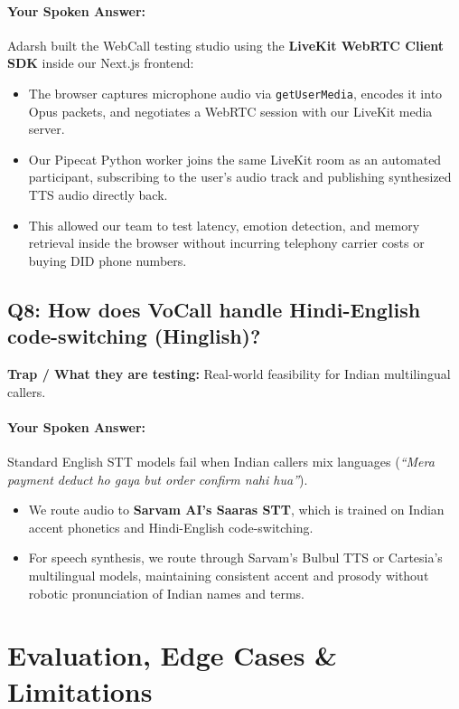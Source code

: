\documentclass[11pt,a4paper]{article}
\begin{document}
\paragraph{Your Spoken Answer:}
Adarsh built the WebCall testing studio using the \textbf{LiveKit WebRTC Client SDK} inside our Next.js frontend:
\begin{itemize}
    \item The browser captures microphone audio via \texttt{getUserMedia}, encodes it into Opus packets, and negotiates a WebRTC session with our LiveKit media server.
    \item Our Pipecat Python worker joins the same LiveKit room as an automated participant, subscribing to the user's audio track and publishing synthesized TTS audio directly back.
    \item This allowed our team to test latency, emotion detection, and memory retrieval inside the browser without incurring telephony carrier costs or buying DID phone numbers.
\end{itemize}

\vspace{1em}

\subsection*{Q8: How does VoCall handle Hindi-English code-switching (Hinglish)?}
\textbf{Trap / What they are testing:} Real-world feasibility for Indian multilingual callers.

\paragraph{Your Spoken Answer:}
Standard English STT models fail when Indian callers mix languages (\textit{``Mera payment deduct ho gaya but order confirm nahi hua''}).
\begin{itemize}
    \item We route audio to \textbf{Sarvam AI's Saaras STT}, which is trained on Indian accent phonetics and Hindi-English code-switching.
    \item For speech synthesis, we route through Sarvam's Bulbul TTS or Cartesia's multilingual models, maintaining consistent accent and prosody without robotic pronunciation of Indian names and terms.
\end{itemize}

\newpage

\section{Evaluation, Edge Cases \& Limitations}
\end{document}
